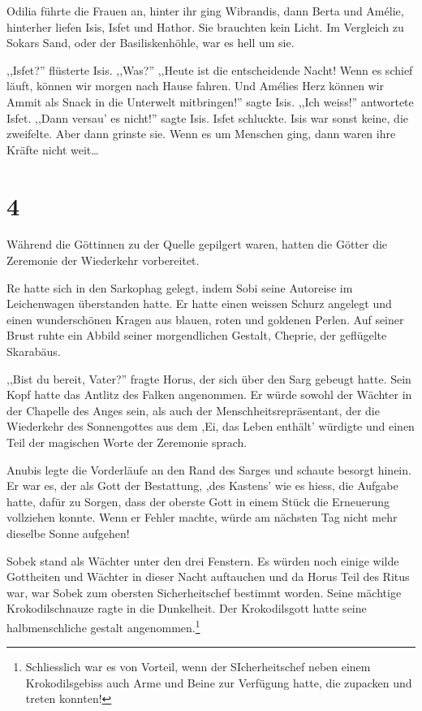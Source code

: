 \documentclass[11pt,titlepage,a5paper]{book}
\begin{document}
Odilia führte die Frauen an, hinter ihr ging Wibrandis, dann Berta und Amélie, hinterher liefen Isis, Isfet und Hathor. Sie brauchten kein Licht. Im Vergleich zu Sokars Sand, oder der Basiliskenhöhle, war es hell um sie.

,,Isfet?'' flüsterte Isis. ,,Was?'' ,,Heute ist die entscheidende Nacht! Wenn es schief läuft, können wir morgen nach Hause fahren. Und Amélies Herz können wir Ammit als Snack in die Unterwelt mitbringen!'' sagte Isis. ,,Ich weiss!'' antwortete Isfet. ,,Dann versau' es nicht!'' sagte Isis. Isfet schluckte. Isis war sonst keine, die zweifelte. Aber dann grinste sie. Wenn es um Menschen ging, dann waren ihre Kräfte nicht weit\dots

\section*{4}

Während die Göttinnen zu der Quelle gepilgert waren, hatten die Götter die Zeremonie der Wiederkehr vorbereitet. 

Re hatte sich in den Sarkophag gelegt, indem Sobi seine Autoreise im Leichenwagen überstanden hatte. Er hatte einen weissen Schurz angelegt und einen wunderschönen Kragen aus blauen, roten und goldenen Perlen. Auf seiner Brust ruhte ein Abbild seiner morgendlichen Gestalt, Cheprie, der geflügelte Skarabäus. 

,,Bist du bereit, Vater?'' fragte Horus, der sich über den Sarg gebeugt hatte. Sein Kopf hatte das Antlitz des Falken angenommen. Er würde sowohl der Wächter in der Chapelle des Anges sein, als auch der Menschheitsrepräsentant, der die Wiederkehr des Sonnengottes aus dem ,Ei, das Leben enthält' würdigte und einen Teil der magischen Worte der Zeremonie sprach.

Anubis legte die Vorderläufe an den Rand des Sarges und schaute besorgt hinein. Er war es, der als Gott der Bestattung, ,des Kastens' wie es hiess, die Aufgabe hatte, dafür zu Sorgen, dass der oberste Gott in einem Stück die Erneuerung vollziehen konnte. Wenn er Fehler machte, würde am nächsten Tag nicht mehr dieselbe Sonne aufgehen!

Sobek stand als Wächter unter den drei Fenstern. Es würden noch einige wilde Gottheiten und Wächter in dieser Nacht auftauchen und da Horus Teil des Ritus war, war Sobek zum obersten Sicherheitschef bestimmt worden. Seine mächtige Krokodilschnauze ragte in die Dunkelheit. Der Krokodilsgott hatte seine halbmenschliche gestalt angenommen.\footnote{Schliesslich war es von Vorteil, wenn der SIcherheitschef neben einem Krokodilsgebiss auch Arme und Beine zur Verfügung hatte, die zupacken und treten konnten!}
\end{document}
